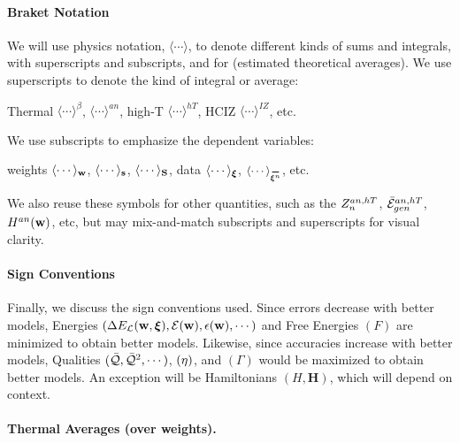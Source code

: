 \paragraph{Braket Notation}
We will use physics \BraKet notation, $\langle\cdots\rangle$,
to denote different kinds of sums and integrals, with superscripts and subscripts,
and for \ExpectedValues (estimated theoretical averages).
We use superscripts to denote the kind of integral or average:
\begin{center}
Thermal $\langle\cdots\rangle^{\beta}$,
\Annealed $\langle\cdots\rangle^{an}$,
high-T $\langle\cdots\rangle^{hT}$,
HCIZ $\langle\cdots\rangle^{IZ}$, etc.
\end{center}
We use subscripts to emphasize the dependent variables:
\begin{center}
  weights $\langle\cdots\rangle_{{\mathbf{w}}}$, $\langle\cdots\rangle_{{\mathbf{s}}}$, $\langle\cdots\rangle_{{\mathbf{S}}}$,
data $\langle\cdots\rangle_{\boldsymbol{\xi}}$, $\langle\cdots\rangle_{\AVGNDXIn}$, etc.
\end{center}
We also reuse these symbols for other quantities, such as the $Z^{an,hT}_{n}$, $\bar{\mathcal{E}}_{gen}^{an,hT}$, $H^{an}({\mathbf{w}})$, etc,
but may mix-and-match subscripts and superscripts for visual clarity.

\paragraph{Sign Conventions}
Finally, we discuss the sign conventions used.  Since errors decrease with better models,
Energies $(\Delta E_{\mathcal{L}}(\mathbf{w},\boldsymbol{\xi}), \mathcal{E}(\mathbf{w}), \epsilon({\mathbf{w}}), \cdots)$ and Free Energies $(F)$ are minimized to obtain better models.
Likewise, since accuracies increase with better models, Qualities $(\bar{\mathcal{Q}}, \bar{\mathcal{Q}}^{2}, \cdots)$,
\SelfOverlap $(\eta)$, and \Quality \GeneratingFunction $(\Gamma)$ would be maximized to obtain better models.
An exception will be Hamiltonians $(H,\mathbf{H})$, which will depend on context.

\paragraph{Thermal Averages (over weights).}

